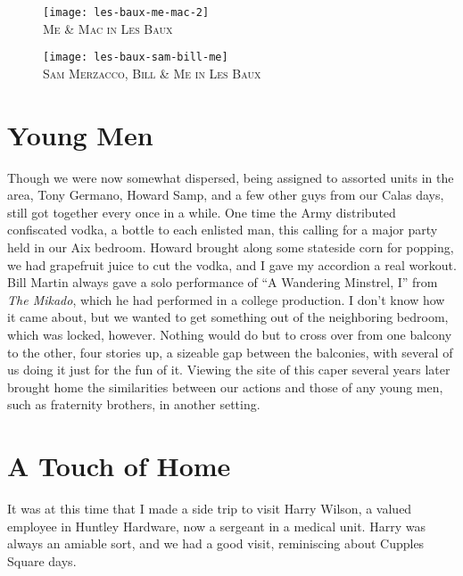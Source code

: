 \documentclass[../m3y]{subfiles}
\begin{document}
\begin{figure}[h]
\centering
\texttt{[image: les-baux-me-mac-2]}\\
\medskip
{\newtimes\textsc{Me \& Mac in Les Baux}}
\end{figure}

\begin{figure}[h]
\centering
\texttt{[image: les-baux-sam-bill-me]}\\
\medskip
{\newtimes\textsc{Sam Merzacco, Bill \& Me in Les Baux}}
\end{figure}

\section{Young Men}
Though we were now somewhat dispersed, being assigned to assorted units in the area, Tony Germano, Howard Samp, and a few other guys from our Calas days, still got together every once in a while. One time the Army distributed confiscated vodka, a bottle to each enlisted man, this calling for a major party held in our Aix bedroom. Howard brought along some stateside corn for popping, we had grapefruit juice to cut the vodka, and I gave my accordion a real workout. Bill Martin always gave a solo performance of ``A Wandering Minstrel, I'' from \emph{The Mikado}, which he had performed in a college production. I don't know how it came about, but we wanted to get something out of the neighboring bedroom, which was locked, however. Nothing would do but to cross over from one balcony to the other, four stories up, a sizeable gap between the balconies, with several of us doing it just for the fun of it. Viewing the site of this caper several years later brought home the similarities between our actions and those of any young men, such as fraternity brothers, in another setting.

\section{A Touch of Home}
It was at this time that I made a side trip to visit Harry Wilson, a valued employee in Huntley Hardware, now a sergeant in a medical unit. Harry was always an amiable sort, and we had a good visit, reminiscing about Cupples Square days.
\end{document}
